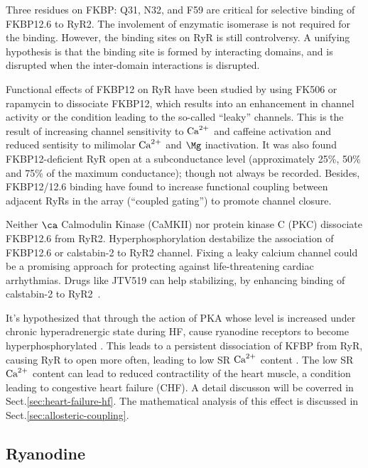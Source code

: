 \begin{framed}
Three residues on FKBP: Q31, N32, and F59 are critical for selective binding of
FKBP12.6 to RyR2. The involement of enzymatic isomerase is not required for the
binding. However, the binding sites on RyR is still controlversy. A unifying
hypothesis is that the binding site is formed by interacting domains, and is
disrupted when the inter-domain interactions is  disrupted.
\end{framed}

Functional effects of FKBP12 on RyR have been studied by using FK506 or
rapamycin to dissociate FKBP12, which results into an enhancement in channel
activity or the condition leading to the so-called ``leaky'' channels.
This is the result of increasing channel sensitivity to ${\text{Ca}^{2+}}$ and caffeine
activation and reduced sentisity to milimolar ${\text{Ca}^{2+}}$ and $\Mg$ inactivation. It
was also found FKBP12-deficient RyR open at a subconductance level
(approximately 25\%, 50\% and 75\% of the maximum conductance); though not
always be recorded.  Besides, FKBP12/12.6 binding have found to increase
functional coupling between adjacent RyRs in the array (``coupled gating'') to
promote channel closure. 

\begin{framed}
  Neither $\ca$ Calmodulin Kinase (CaMKII) nor protein kinase C (PKC)
  dissociate FKBP12.6 from RyR2. Hyperphosphorylation destabilize the
  association of FKBP12.6 or calstabin-2 to RyR2 channel. Fixing a
  leaky calcium channel could be a promising approach for protecting
  against life-threatening cardiac arrhythmias. Drugs like JTV519 can
  help stabilizing, by enhancing binding of calstabin-2 to
  RyR2~\citep{Wehrens2004}.
\end{framed}

It's hypothesized that through the action of PKA whose level is increased under
chronic hyperadrenergic state during HF, cause ryanodine receptors to become
hyperphosphorylated \citep{marx2000, marks2002}. This leads to a persistent
dissociation of KFBP from RyR, causing RyR to open more often, leading to low SR
${\text{Ca}^{2+}}$ content \citep{marx2000, ono2000, yano2003, wehrens2003}. The low SR ${\text{Ca}^{2+}}$
content can lead to reduced contractility of the heart muscle, a condition
leading to congestive heart failure (CHF). A detail discusson will be coverred
in Sect.\ref{sec:heart-failure-hf}. The mathematical analysis of this effect is
discussed in Sect.\ref{sec:allosteric-coupling}.


\subsection{Ryanodine}

